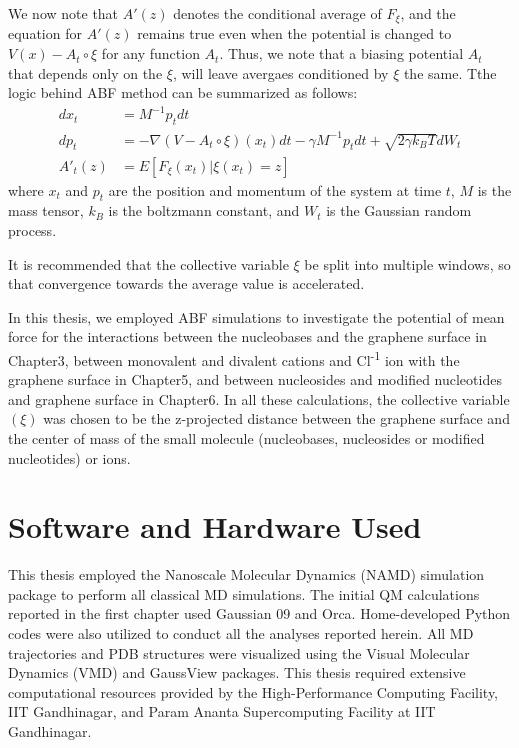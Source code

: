 We now note that $A'(z)$ denotes the conditional average of $F_\xi$, and the equation for $A'(z)$ remains true even when the potential is changed to $V(x) - A_t\circ\xi$ for any function $A_t$. Thus, we note that a biasing potential $A_t$ that depends only on the $\xi$, will leave avergaes conditioned by $\xi$ the same. Tthe logic behind ABF method can be summarized as follows:
\begin{align*}
    dx_t &= M^{-1} p_t dt \\
    dp_t &= -\nabla(V - A_t\circ\xi)(x_t)dt - \gamma M^{-1}p_tdt + \sqrt{2\gamma k_BT}dW_t \\
    A'_t(z) &= E\left[F_\xi(x_t)|\xi(x_t)=z\right]
\end{align*}
where $x_t$ and $p_t$ are the position and momentum of the system at time $t$, $M$ is the mass tensor, $k_B$ is the boltzmann constant, and $W_t$ is the Gaussian random process.

It is recommended that the collective variable $\xi$ be split into multiple windows, so that convergence towards the average value is accelerated.

In this thesis, we employed ABF simulations to investigate the potential of mean force for the interactions between the nucleobases and the graphene surface in Chapter3, between monovalent and divalent cations and Cl\textsuperscript{-1} ion with the graphene surface in Chapter5, and between nucleosides and modified nucleotides and graphene surface in Chapter6. In all these calculations, the collective variable $(\xi)$ was chosen to be the z-projected distance between the graphene surface and the center of mass of the small molecule (nucleobases, nucleosides or modified nucleotides) or ions.

\section{Software and Hardware Used}
This thesis employed the Nanoscale Molecular Dynamics (NAMD) simulation package to perform all classical MD simulations. The initial QM calculations reported in the first chapter used Gaussian 09 and Orca. Home-developed Python codes were also utilized to conduct all the analyses reported herein. All MD trajectories and PDB structures were visualized using the Visual Molecular Dynamics (VMD) and GaussView packages. This thesis required extensive computational resources provided by the High-Performance Computing Facility, IIT Gandhinagar, and Param Ananta Supercomputing Facility at IIT Gandhinagar. 